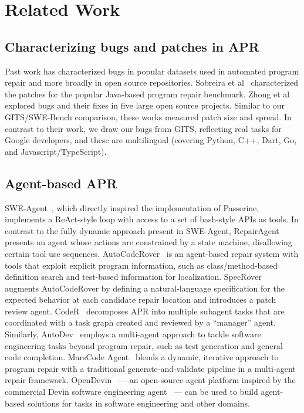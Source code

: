 \section{Related Work}\label{sec:relatedwork}

\subsection{Characterizing bugs and patches in APR
}
Past work has characterized bugs in popular datasets used in automated program repair and more broadly in open source repositories. Sobreira et al~\cite{sobreira2018dissection} characterized the patches for the popular Java-based program repair benchmark. Zhong et al~\cite{zhong2015empirical} explored bugs and their fixes in five large open source projects.  Similar to our GITS/SWE-Bench comparison, these works measured patch size and spread. In contrast to their work, we draw our bugs from GITS, reflecting real tasks for Google developers, and these are multilingual (covering Python, C++, Dart, Go, and Javascript/TypeScript).

\subsection{Agent-based APR}

SWE-Agent~\cite{sweagent}, which directly inspired the implementation of Passerine, implements a ReAct-style loop with access to a set of bash-style APIs as tools. In contrast to the fully dynamic approach present in SWE-Agent, RepairAgent~\cite{repairagent} presents an agent whose actions are constrained by a state machine, disallowing certain tool use sequences. AutoCodeRover~\cite{autocoderover} is an agent-based repair system with tools that exploit explicit program information, such as class/method-based definition search and test-based information for localization. SpecRover~\cite{specrover} augments AutoCodeRover by defining a natural-language specification for the expected behavior at each candidate repair location and introduces a patch review agent. CodeR~\cite{codeR} decomposes APR into multiple subagent tasks that are coordinated with a task graph created and reviewed by a “manager” agent. Similarly, AutoDev~\cite{autodev} employs a multi-agent approach to tackle software engineering tasks beyond program repair, such as test generation and general code completion. MarsCode Agent~\cite{marscode} blends a dynamic, iterative approach to program repair with a traditional generate-and-validate pipeline in a multi-agent repair framework. OpenDevin~\cite{opendevin} — an open-source agent platform inspired by the commercial Devin software engineering agent~\cite{devin} — can be used to build agent-based solutions for tasks in software engineering and other domains.

